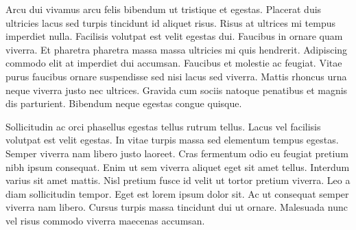 Arcu dui vivamus arcu felis bibendum ut tristique et egestas. 
Placerat duis ultricies lacus sed turpis tincidunt id aliquet risus. 
Risus at ultrices mi tempus imperdiet nulla. Facilisis volutpat est 
velit egestas dui. Faucibus in ornare quam viverra. Et pharetra pharetra
 massa massa ultricies mi quis hendrerit. Adipiscing commodo elit at 
imperdiet dui accumsan. Faucibus et molestie ac feugiat. Vitae purus 
faucibus ornare suspendisse sed nisi lacus sed viverra. Mattis rhoncus 
urna neque viverra justo nec ultrices. Gravida cum sociis natoque 
penatibus et magnis dis parturient. Bibendum neque egestas congue 
quisque.


Sollicitudin ac orci phasellus egestas tellus rutrum tellus. Lacus 
vel facilisis volutpat est velit egestas. In vitae turpis massa sed 
elementum tempus egestas. Semper viverra nam libero justo laoreet. Cras 
fermentum odio eu feugiat pretium nibh ipsum consequat. Enim ut sem 
viverra aliquet eget sit amet tellus. Interdum varius sit amet mattis. 
Nisl pretium fusce id velit ut tortor pretium viverra. Leo a diam 
sollicitudin tempor. Eget est lorem ipsum dolor sit. Ac ut consequat 
semper viverra nam libero. Cursus turpis massa tincidunt dui ut ornare. 
Malesuada nunc vel risus commodo viverra maecenas accumsan.


